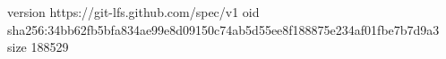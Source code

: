 version https://git-lfs.github.com/spec/v1
oid sha256:34bb62fb5bfa834ae99e8d09150c74ab5d55ee8f188875e234af01fbe7b7d9a3
size 188529
